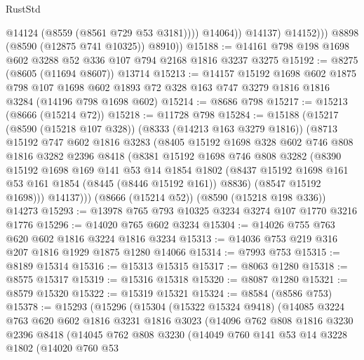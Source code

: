\begin{lexlean}{RustStd}
\begin{coremodule}
                        @14124
                        (@8559 (@8561 @729 @53 @3181))))
                    @14064))
                @14137)
              @14152)))
        @8898
        (@8590 (@12875 @741 @10325))
        @8910))
@15188 := @14161 @798 @198 @1698 @602 @3288 @52 @336 @107 @794 @2168 @1816 @3237 @3275
@15192 := @8275 (@8605 (@11694 @8607)) @13714
@15213 := @14157
    @15192
    @1698
    @602
    @1875
    @798
    @107
    @1698
    @602
    @1893
    @72
    @328
    @163
    @747
    @3279
    @1816
    @1816
    @3284
    (@14196 @798 @1698 @602)
@15214 := @8686 @798
@15217 := @15213 (@8666 (@15214 @72))
@15218 := @11728 @798
@15284 := @15188
    (@15217
      (@8590 (@15218 @107 @328))
      (@8333 (@14213 @163 @3279 @1816))
      (@8713
        @15192
        @747
        @602
        @1816
        @3283
        (@8405
          @15192
          @1698
          @328
          @602
          @746
          @808
          @1816
          @3282
          @2396
          @8418
          (@8381
            @15192
            @1698
            @746
            @808
            @3282
            (@8390
              @15192
              @1698
              @169
              @141
              @53
              @14
              @1854
              @1802
              (@8437 @15192 @1698 @161 @53 @161 @1854 (@8445 (@8446 @15192 @161)) @8836)
              (@8547 @15192 @1698)))
          @14137)))
    (@8666 (@15214 @52))
    (@8590 (@15218 @198 @336))
    @14273
@15293 := @13978 @765 @793 @10325 @3234 @3274 @107 @1770 @3216 @1776
@15296 := @14020 @765 @602 @3234
@15304 := @14026 @755 @763 @620 @602 @1816 @3224 @1816 @3234
@15313 := @14036 @753 @219 @316 @207 @1816 @1929 @1875 @1280 @14066
@15314 := @7993 @753
@15315 := @8189 @15314
@15316 := @15313 @15315
@15317 := @8063 @1280
@15318 := @8575 @15317
@15319 := @15316 @15318
@15320 := @8087 @1280
@15321 := @8579 @15320
@15322 := @15319 @15321
@15324 := @8584 (@8586 @753)
@15378 := @15293
    (@15296
      (@15304
        (@15322 @15324 @9418)
        (@14085
          @3224
          @763
          @620
          @602
          @1816
          @3231
          @1816
          @3023
          (@14096
            @762
            @808
            @1816
            @3230
            @2396
            @8418
            (@14045
              @762
              @808
              @3230
              (@14049
                @760
                @141
                @53
                @14
                @3228
                @1802
                (@14020
                  @760
                  @53

\end{coremodule}
\end{lexlean}
